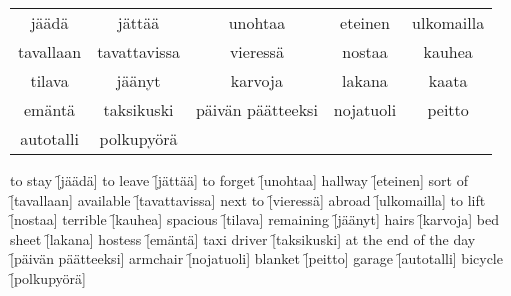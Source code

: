\begin{center}
  \begin{tabular}{|c c c c c|}
    \hline
    jäädä & jättää & unohtaa & eteinen & ulkomailla \\
    tavallaan & tavattavissa & vieressä & nostaa & kauhea \\
    tilava & jäänyt & karvoja & lakana & kaata  \\
    emäntä & taksikuski & päivän päätteeksi & nojatuoli & peitto \\
    autotalli & polkupyörä &&& \\
    \hline
  \end{tabular}
\end{center}

\begin{questions}
  \begin{multicols}{3}
    \raggedcolumns
    \question to stay   \f[jäädä]
    \question to leave  \f[jättää]
    \question to forget \f[unohtaa]
    \question hallway   \f[eteinen]
    \question sort of   \f[tavallaan]
    \question available \f[tavattavissa]
    \question next to   \f[vieressä]
    \question abroad    \f[ulkomailla]
    \question to lift   \f[nostaa]
    \question terrible  \f[kauhea]
    \question spacious  \f[tilava]
    \question remaining \f[jäänyt]
    \question hairs     \f[karvoja]
    \question bed sheet \f[lakana]
    \question hostess   \f[emäntä]
    \question taxi driver \f[taksikuski]
    \question at the end of the day \f[päivän päätteeksi]
    \question armchair  \f[nojatuoli]
    \question blanket   \f[peitto]
    \question garage    \f[autotalli]
    \question bicycle   \f[polkupyörä]
  \end{multicols}
\end{questions}
